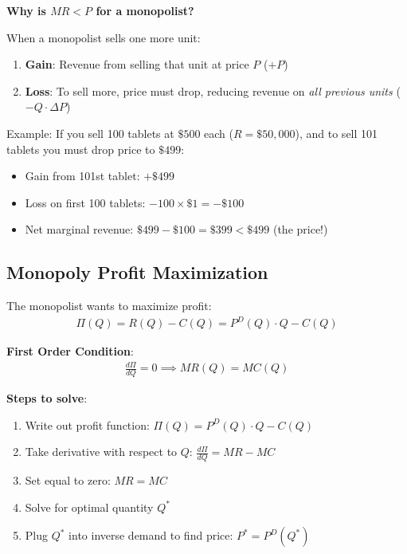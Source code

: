 \documentclass[12pt]{article}
\begin{document}
\begin{warning}
\textbf{Why is $MR < P$ for a monopolist?}

When a monopolist sells one more unit:
\begin{enumerate}
\item \textbf{Gain}: Revenue from selling that unit at price $P$ ($+P$)
\item \textbf{Loss}: To sell more, price must drop, reducing revenue on \textit{all previous units} ($-Q \cdot \Delta P$)
\end{enumerate}

Example: If you sell 100 tablets at $\$500$ each ($R = \$50,000$), and to sell 101 tablets you must drop price to $\$499$:
\begin{itemize}
\item Gain from 101st tablet: $+\$499$
\item Loss on first 100 tablets: $-100 \times \$1 = -\$100$
\item Net marginal revenue: $\$499 - \$100 = \$399 < \$499$ (the price!)
\end{itemize}
\end{warning}

\newpage

\subsection{Monopoly Profit Maximization}

\begin{keyidea}
The monopolist wants to maximize profit:
\begin{align*}
\Pi(Q) = R(Q) - C(Q) = P^D(Q) \cdot Q - C(Q)
\end{align*}

\textbf{First Order Condition}:
\begin{align*}
\frac{d\Pi}{dQ} = 0 \implies MR(Q) = MC(Q)
\end{align*}

\textbf{Steps to solve}:
\begin{enumerate}
\item Write out profit function: $\Pi(Q) = P^D(Q) \cdot Q - C(Q)$
\item Take derivative with respect to $Q$: $\frac{d\Pi}{dQ} = MR - MC$
\item Set equal to zero: $MR = MC$
\item Solve for optimal quantity $Q^*$
\item Plug $Q^*$ into inverse demand to find price: $P^* = P^D(Q^*)$
\end{enumerate}
\end{keyidea}
\end{document}

